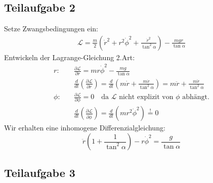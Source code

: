 \documentclass[a4paper,german,12pt,smallheadings]{scrartcl}
\begin{document}
\subsection*{Teilaufgabe 2}
Setze Zwangsbedingungen ein:
\begin{align*}
\mathcal{L}=\frac{m}{2} \left(\dot{r}^2+r^2\dot{\phi}^2+\frac{\dot{r}^2}{\tan^2 \alpha}\right)-\frac{mgr}{\tan \alpha}
\end{align*}
Entwickeln der Lagrange-Gleichung 2.Art:
\begin{align*}
r: & \quad \frac{\partial \mathcal{L}}{\partial r}=mr\dot{\phi}^2-\frac{mg}{\tan \alpha}\\
& \quad \frac{d}{dt}\left(\frac{\partial \mathcal{L}}{\partial \dot{r}}\right)=\frac{d}{dt}\left(m\dot{r}+\frac{m\dot{r}}{\tan^2 \alpha}\right)=m \ddot{r}+\frac{m \ddot{r}}{\tan^2 \alpha}\\
\phi: & \quad \frac{\partial \mathcal{L}}{\partial \phi}=0 \quad \text{da $\mathcal{L}$ nicht explizit von $\phi$ abhängt.}\\
& \quad \frac{d}{dt}\left(\frac{\partial \mathcal{L}}{\partial \dot{\phi}}\right)=\frac{d}{dt}\left(mr^2\dot{\phi}^2\right)\overset{!}{=}0
\end{align*}
Wir erhalten eine inhomogene Differenzialgleichung:
\begin{equation*}
\ddot{r} \left(1+\frac{1}{\tan^2 \alpha}\right)-r\dot{\phi}^2=\frac{g}{\tan \alpha}
\end{equation*}

\subsection*{Teilaufgabe 3}
\end{document}
